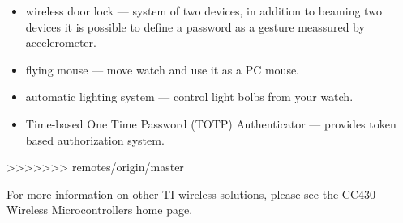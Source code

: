 \begin{itemize}
  \item wireless door lock --- system of two devices, in addition to beaming two devices it is possible to define a password as a gesture meassured by accelerometer.
  \item flying mouse --- move watch and use it as a PC mouse.
  \item automatic lighting system --- control light bolbs from your watch.
  \item Time-based One Time Password (TOTP) Authenticator --- provides token based authorization system.
\end{itemize}
>>>>>>> remotes/origin/master

  For more information on other TI wireless solutions, please see the
  CC430 Wireless Microcontrollers home page.



